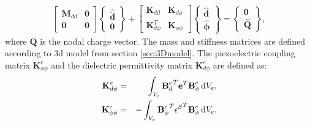 \documentclass[11pt,a4paper,final]{report}
\begin{document}
\begin{eqnarray}
	\left [\begin{array}{cc}
		\textbf{M}_{dd} & \textbf{0}\\
		\textbf{0} & \textbf{0}
	\end{array}\right]
	\left \{\begin{array}{c}
		\widehat{\ddot{\textbf{d}}} \\
		\textbf{0}
	\end{array}\right \} +
	\left [\begin{array}{cc}
		\textbf{K}_{dd} & \textbf{K}_{d \phi}\\
		\textbf{K}_{d \phi}^T & \textbf{K}_{\phi \phi}
	\end{array}\right]
	\left \{\begin{array}{c}
		\widehat{\textbf{d}} \\
		\widehat{\boldsymbol{\phi}}
	\end{array}\right \}  = 
	\left \{\begin{array}{c}
		\textbf{0}\\
		\widehat{\textbf{Q}}
	\end{array}\right \},
	\label{eq:pzt_sem}
\end{eqnarray}
where \(\textbf{Q}\) is the nodal charge vector.
The mass and stiffness matrices are defined according to \ac{3d} model from section \ref{sec:3Dmodel}.
The piezoelectric coupling matrix \(\textbf{K}_{\phi \phi}^e\) and the dielectric permittivity matrix \(\textbf{K}_{d \phi}^e\) are defined as:
\begin{eqnarray}
	\textbf{K}_{d\phi}^e & = & \int_{V_e}{\textbf{B}_d^e}^T\textbf{e}^T \textbf{B}_{\phi}^e \mathop{}\!\mathrm{d} V_e,\\
	\textbf{K}_{\phi \phi}^e & = & -\int_{V_e}{\textbf{B}_{\phi}^e}^T 
	{\textbf{\(\epsilon\)}^S}^T \textbf{B}_{\phi}^e \mathop{}\!\mathrm{d} V_e.
\end{eqnarray}
\end{document}
